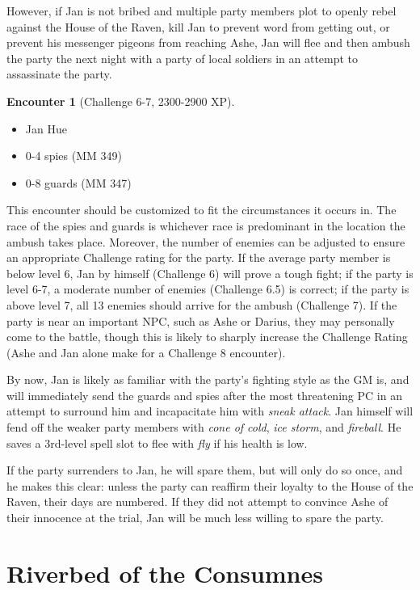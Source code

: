 \documentclass{report}
\theoremstyle{definition}
\newtheorem{enc}{Encounter}[chapter]
\begin{document}
However, if Jan is not bribed and multiple party members plot to openly rebel against the House of the Raven, kill Jan to prevent word from getting out, or prevent his messenger pigeons from reaching Ashe, Jan will flee and then ambush the party the next night with a party of local soldiers in an attempt to assassinate the party.

\begin{enc}[Challenge 6-7, 2300-2900 XP]
\leavevmode
\begin{itemize}
\item Jan Hue
\item 0-4 spies (MM 349)
\item 0-8 guards (MM 347)
\end{itemize}

This encounter should be customized to fit the circumstances it occurs in. The race of the spies and guards is whichever race is predominant in the location the ambush takes place. Moreover, the number of enemies can be adjusted to ensure an appropriate Challenge rating for the party. If the average party member is below level 6, Jan by himself (Challenge 6) will prove a tough fight; if the party is level 6-7, a moderate number of enemies (Challenge 6.5) is correct; if the party is above level 7, all 13 enemies should arrive for the ambush (Challenge 7). If the party is near an important NPC, such as Ashe or Darius, they may personally come to the battle, though this is likely to sharply increase the Challenge Rating (Ashe and Jan alone make for a Challenge 8 encounter).

By now, Jan is likely as familiar with the party's fighting style as the GM is, and will immediately send the guards and spies after the most threatening PC in an attempt to surround him and incapacitate him with \textit{sneak attack}. Jan himself will fend off the weaker party members with \textit{cone of cold}, \textit{ice storm}, and \textit{fireball}. He saves a 3rd-level spell slot to flee with \textit{fly} if his health is low.
\end{enc}

If the party surrenders to Jan, he will spare them, but will only do so once, and he makes this clear: unless the party can reaffirm their loyalty to the House of the Raven, their days are numbered. If they did not attempt to convince Ashe of their innocence at the trial, Jan will be much less willing to spare the party.

\chapter{Riverbed of the Consumnes}
\end{document}
